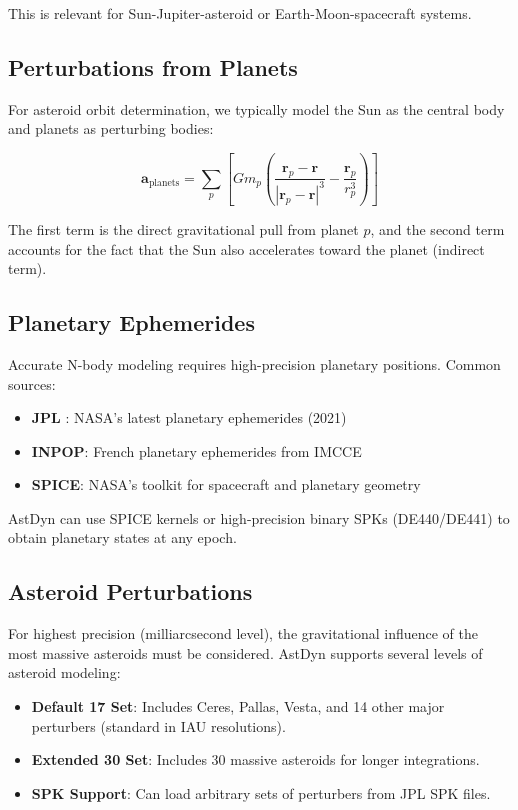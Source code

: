 This is relevant for Sun-Jupiter-asteroid or Earth-Moon-spacecraft systems.

\subsection{Perturbations from Planets}

For asteroid orbit determination, we typically model the Sun as the central body and planets as perturbing bodies:

\begin{equation}
    \mathbf{a}_{\text{planets}} = \sum_{p} \left[ G m_p \left( \frac{\mathbf{r}_p - \mathbf{r}}{|\mathbf{r}_p - \mathbf{r}|^3} - \frac{\mathbf{r}_p}{r_p^3} \right) \right]
\end{equation}

The first term is the direct gravitational pull from planet $p$, and the second term accounts for the fact that the Sun also accelerates toward the planet (indirect term).

\subsection{Planetary Ephemerides}

Accurate N-body modeling requires high-precision planetary positions. Common sources:

\begin{itemize}
    \item \textbf{JPL }: NASA's latest planetary ephemerides (2021)
    \item \textbf{INPOP}: French planetary ephemerides from IMCCE
    \item \textbf{SPICE}: NASA's toolkit for spacecraft and planetary geometry
\end{itemize}

AstDyn can use SPICE kernels or high-precision binary SPKs (DE440/DE441) to obtain planetary states at any epoch.

\subsection{Asteroid Perturbations}

For highest precision (milliarcsecond level), the gravitational influence of the most massive asteroids must be considered. AstDyn supports several levels of asteroid modeling:
\begin{itemize}
    \item \textbf{Default 17 Set}: Includes Ceres, Pallas, Vesta, and 14 other major perturbers (standard in IAU resolutions).
    \item \textbf{Extended 30 Set}: Includes 30 massive asteroids for longer integrations.
    \item \textbf{SPK Support}: Can load arbitrary sets of perturbers from JPL SPK files.
\end{itemize}


